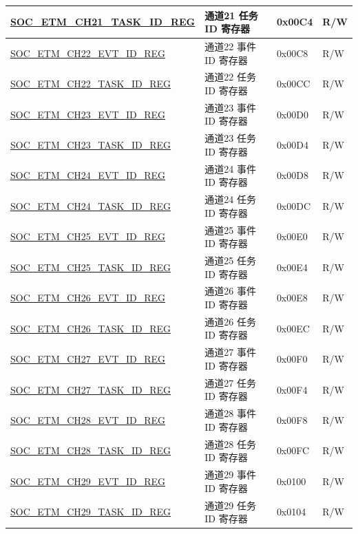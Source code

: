 \begin{longtable}{ | p{6cm} | p{6.2cm} | p{1.3cm} | p{2cm} | }
\hyperref[regdesc:SOCETMCH0TASKIDREG]{SOC\_ETM\_CH21\_TASK\_ID\_REG} & 通道21 任务 ID 寄存器 & 0x00C4 & R/W \\ \hline
\hyperref[regdesc:SOCETMCH0EVTIDREG]{SOC\_ETM\_CH22\_EVT\_ID\_REG} & 通道22 事件 ID 寄存器 & 0x00C8 & R/W \\ \hline
\hyperref[regdesc:SOCETMCH0TASKIDREG]{SOC\_ETM\_CH22\_TASK\_ID\_REG} & 通道22 任务 ID 寄存器 & 0x00CC & R/W \\ \hline
\hyperref[regdesc:SOCETMCH0EVTIDREG]{SOC\_ETM\_CH23\_EVT\_ID\_REG} & 通道23 事件 ID 寄存器 & 0x00D0 & R/W \\ \hline
\hyperref[regdesc:SOCETMCH0TASKIDREG]{SOC\_ETM\_CH23\_TASK\_ID\_REG} & 通道23 任务 ID 寄存器 & 0x00D4 & R/W \\ \hline
\hyperref[regdesc:SOCETMCH0EVTIDREG]{SOC\_ETM\_CH24\_EVT\_ID\_REG} & 通道24 事件 ID 寄存器 & 0x00D8 & R/W \\ \hline
\hyperref[regdesc:SOCETMCH0TASKIDREG]{SOC\_ETM\_CH24\_TASK\_ID\_REG} & 通道24 任务 ID 寄存器 & 0x00DC & R/W \\ \hline
\hyperref[regdesc:SOCETMCH0EVTIDREG]{SOC\_ETM\_CH25\_EVT\_ID\_REG} & 通道25 事件 ID 寄存器 & 0x00E0 & R/W \\ \hline
\hyperref[regdesc:SOCETMCH0TASKIDREG]{SOC\_ETM\_CH25\_TASK\_ID\_REG} & 通道25 任务 ID 寄存器 & 0x00E4 & R/W \\ \hline
\hyperref[regdesc:SOCETMCH0EVTIDREG]{SOC\_ETM\_CH26\_EVT\_ID\_REG} & 通道26 事件 ID 寄存器 & 0x00E8 & R/W \\ \hline
\hyperref[regdesc:SOCETMCH0TASKIDREG]{SOC\_ETM\_CH26\_TASK\_ID\_REG} & 通道26 任务 ID 寄存器 & 0x00EC & R/W \\ \hline
\hyperref[regdesc:SOCETMCH0EVTIDREG]{SOC\_ETM\_CH27\_EVT\_ID\_REG} & 通道27 事件 ID 寄存器 & 0x00F0 & R/W \\ \hline
\hyperref[regdesc:SOCETMCH0TASKIDREG]{SOC\_ETM\_CH27\_TASK\_ID\_REG} & 通道27 任务 ID 寄存器 & 0x00F4 & R/W \\ \hline
\hyperref[regdesc:SOCETMCH0EVTIDREG]{SOC\_ETM\_CH28\_EVT\_ID\_REG} & 通道28 事件 ID 寄存器 & 0x00F8 & R/W \\ \hline
\hyperref[regdesc:SOCETMCH0TASKIDREG]{SOC\_ETM\_CH28\_TASK\_ID\_REG} & 通道28 任务 ID 寄存器 & 0x00FC & R/W \\ \hline
\hyperref[regdesc:SOCETMCH0EVTIDREG]{SOC\_ETM\_CH29\_EVT\_ID\_REG} & 通道29 事件 ID 寄存器 & 0x0100 & R/W \\ \hline
\hyperref[regdesc:SOCETMCH0TASKIDREG]{SOC\_ETM\_CH29\_TASK\_ID\_REG} & 通道29 任务 ID 寄存器 & 0x0104 & R/W \\ \hline

\end{longtable}
